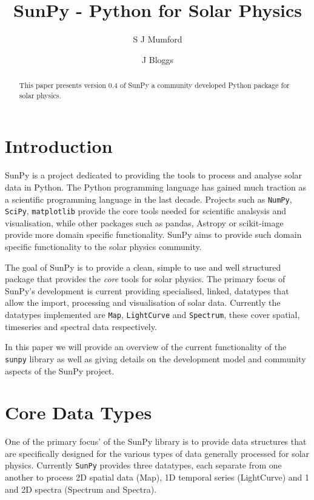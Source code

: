 \documentclass[12pt]{iopart}
\begin{document}
\title{SunPy - Python for Solar Physics}

\author{S J Mumford}
\address{Solar Physics \& Space Plasma Research Centre (SP$^{2}$RC), School of 
Mathematics and Statistics, The University of Sheffield, Hicks Building, 
Hounsfield Road, Sheffield, S3 7RH U.K.}

\author{J Bloggs}
\address{Wibble wiblle wiblle}


\begin{abstract}
This paper presents version 0.4 of SunPy a community developed Python package 
for solar physics.

\end{abstract}

\maketitle

\section{Introduction}
SunPy is a project dedicated to providing the tools to process and analyse 
solar data in Python.
The Python programming language has gained much traction as a scientific 
programming language in the last decade.
Projects such as \texttt{NumPy}, \texttt{SciPy}, \texttt{matplotlib} provide 
the core tools 
needed 
for 
scientific analsysis and visualisation, while other packages such as pandas, 
Astropy or scikit-image provide more domain specific functionality.
SunPy aims to provide such domain specific functionality to the solar physics 
community.

The goal of SunPy is to provide a clean, simple to use and well structured 
package that provides the \textit{core} tools for solar physics.
The primary focus of SunPy's development is current providing specialised, 
linked, datatypes that allow the import, processing and visualisation of solar 
data. Currently the datatypes implemented are \texttt{Map}, \texttt{LightCurve} 
and \texttt{Spectrum}, these cover spatial, timeseries and spectral data 
respectively.

In this paper we will provide an overview of the current functionality of the 
\texttt{sunpy} library as well as giving details on the development model and 
community aspects of the SunPy project.

\section{Core Data Types}
One of the primary focus' of the SunPy library is to provide data structures 
that are 
specifically designed for the various types of data generally processed for 
solar physics. Currently \texttt{SunPy} provides three datatypes, each separate 
from one another to process 2D spatial data (Map), 1D temporal series 
(LightCurve) and 1 and 2D spectra (Spectrum and Spectra).
\end{document}
